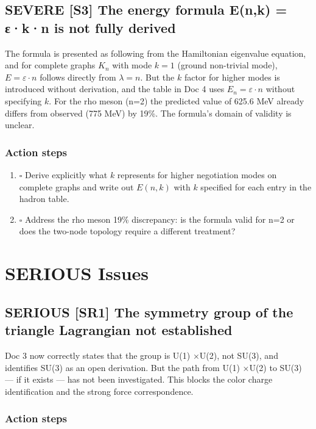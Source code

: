 \documentclass[11pt,letterpaper]{article}
\begin{document}
\subsection{{\bfseries\sffamily SEVERE} [S3] The energy formula E(n,k) = ε·k·n is not fully derived}
\label{sec:org5eca076}
The formula is presented as following from the Hamiltonian eigenvalue equation,
and for complete graphs \(K_n\) with mode \(k=1\) (ground non-trivial mode),
\(E = \varepsilon \cdot n\) follows directly from \(\lambda = n\). But the \(k\)
factor for higher modes is introduced without derivation, and the table in Doc 4
uses \(E_n = \varepsilon \cdot n\) without specifying \(k\). For the rho meson
(n=2) the predicted value of 625.6 MeV already differs from observed (775 MeV)
by 19\%. The formula's domain of validity is unclear.

\subsubsection{Action steps}
\label{sec:org7934fd4}

\begin{enumerate}
\item{$\square$} Derive explicitly what \(k\) represents for higher negotiation modes on
complete graphs and write out \(E(n,k)\) with \(k\) specified for each entry
in the hadron table.
\item{$\square$} Address the rho meson 19\% discrepancy: is the formula valid for n=2
or does the two-node topology require a different treatment?
\end{enumerate}

\section{{\bfseries\sffamily SERIOUS} Issues}
\label{sec:orgc9caffd}

\subsection{{\bfseries\sffamily SERIOUS} [SR1] The symmetry group of the triangle Lagrangian not established}
\label{sec:org8468c82}
Doc 3 now correctly states that the group is U(1) ×U(2), not SU(3), and
identifies SU(3) as an open derivation. But the path from U(1) ×U(2) to SU(3)
--- if it exists --- has not been investigated. This blocks the color charge
identification and the strong force correspondence.

\subsubsection{Action steps}
\label{sec:orgf6b7ff9}
\end{document}
